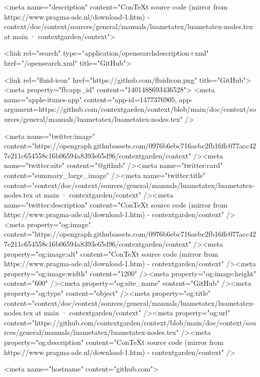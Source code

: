     

      <meta name="description" content="ConTeXt source code (mirror from https://www.pragma-ade.nl/download-1.htm) - context/doc/context/sources/general/manuals/luametatex/luametatex-nodes.tex at main · contextgarden/context">

      <link rel="search" type="application/opensearchdescription+xml" href="/opensearch.xml" title="GitHub">

    <link rel="fluid-icon" href="https://github.com/fluidicon.png" title="GitHub">
    <meta property="fb:app_id" content="1401488693436528">
    <meta name="apple-itunes-app" content="app-id=1477376905, app-argument=https://github.com/contextgarden/context/blob/main/doc/context/sources/general/manuals/luametatex/luametatex-nodes.tex" />

      <meta name="twitter:image" content="https://opengraph.githubassets.com/0976b6ebc716aebc2fb16ffc077acc427e211c654558c16b06594a8393e65d96/contextgarden/context" /><meta name="twitter:site" content="@github" /><meta name="twitter:card" content="summary_large_image" /><meta name="twitter:title" content="context/doc/context/sources/general/manuals/luametatex/luametatex-nodes.tex at main · contextgarden/context" /><meta name="twitter:description" content="ConTeXt source code (mirror from https://www.pragma-ade.nl/download-1.htm) - contextgarden/context" />
  <meta property="og:image" content="https://opengraph.githubassets.com/0976b6ebc716aebc2fb16ffc077acc427e211c654558c16b06594a8393e65d96/contextgarden/context" /><meta property="og:image:alt" content="ConTeXt source code (mirror from https://www.pragma-ade.nl/download-1.htm) - contextgarden/context" /><meta property="og:image:width" content="1200" /><meta property="og:image:height" content="600" /><meta property="og:site_name" content="GitHub" /><meta property="og:type" content="object" /><meta property="og:title" content="context/doc/context/sources/general/manuals/luametatex/luametatex-nodes.tex at main · contextgarden/context" /><meta property="og:url" content="https://github.com/contextgarden/context/blob/main/doc/context/sources/general/manuals/luametatex/luametatex-nodes.tex" /><meta property="og:description" content="ConTeXt source code (mirror from https://www.pragma-ade.nl/download-1.htm) - contextgarden/context" />
  




      <meta name="hostname" content="github.com">



